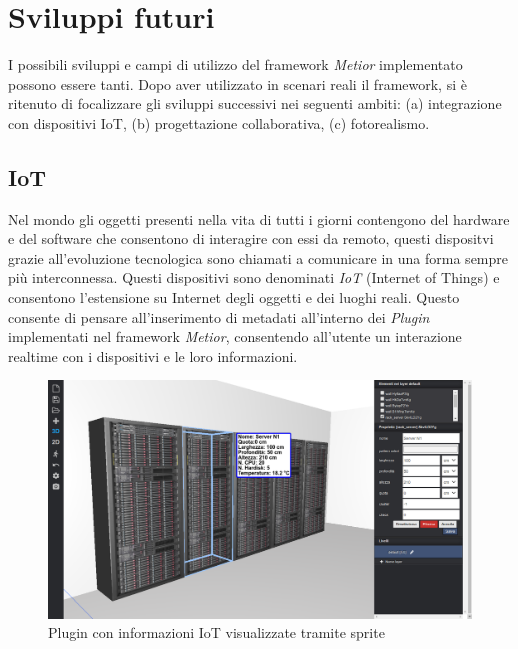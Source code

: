 \section{Sviluppi futuri}
\label{sec:conclusions_section_2}

I possibili sviluppi e campi di utilizzo del framework \emph{Metior} implementato possono essere tanti.
Dopo aver utilizzato in scenari reali il framework, si è ritenuto di focalizzare gli sviluppi successivi nei seguenti ambiti:
(a) integrazione con dispositivi IoT, (b) progettazione collaborativa, (c) fotorealismo.

\subsection{IoT}
\label{sec:conclusions_section_2_sub_1}
Nel mondo gli oggetti presenti nella vita di tutti i giorni contengono del hardware e del software
che consentono di interagire con essi da remoto, questi dispositvi grazie all'evoluzione tecnologica sono chiamati
a comunicare in una forma sempre più interconnessa. Questi dispositivi sono denominati \emph{IoT} (Internet of Things) e
consentono l'estensione su Internet degli oggetti e dei luoghi reali. Questo consente di pensare all'inserimento di
metadati all'interno dei \emph{Plugin} implementati nel framework \emph{Metior},
consentendo all'utente un interazione realtime con i dispositivi e le loro informazioni.\\

\begin{figure}[htbp] %
   \centering
   \includegraphics[width=1\linewidth]{images/iot}
   \caption{Plugin con informazioni IoT visualizzate tramite sprite}
   \label{fig:iot}
   \end{figure}

